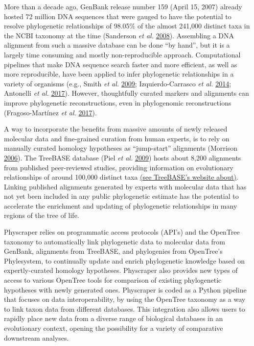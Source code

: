 \documentclass[]{article}
\begin{document}
More than a decade ago, GenBank release number 159 (April 15, 2007) already hosted 72 million DNA sequences that were gauged to have the potential to resolve phylogenetic relationships of 98.05\% of the almost 241,000 distinct taxa in the NCBI taxonomy at the time (Sanderson \emph{et al.} \protect\hyperlink{ref-sanderson2008phylota}{2008}). Assembling a DNA alignment from such a massive database can be done ``by hand'', but it is a largely time consuming and mostly non-reproducible approach. Computational pipelines that make DNA sequence search faster and more efficient, as well as more reproducible, have been applied to infer phylogenetic relationships in a variety of organisms (e.g., Smith \emph{et al.} \protect\hyperlink{ref-smith2009mega}{2009}; Izquierdo-Carrasco \emph{et al.} \protect\hyperlink{ref-izquierdo2014pumper}{2014}; Antonelli \emph{et al.} \protect\hyperlink{ref-antonelli2017toward}{2017}).
However, thoughtfully curated markers and alignments can improve phylogenetic reconstructions, even in phylogenomic reconstructions (Fragoso-Martínez \emph{et al.} \protect\hyperlink{ref-fragoso2017pilot}{2017}).

A way to incorporate the benefits from massive amounts of newly released molecular data and fine-grained curation from human experts, is to rely on manually curated homology hypotheses as ``jump-start'' alignments (Morrison \protect\hyperlink{ref-morrison2006multiple}{2006}). The TreeBASE database (Piel \emph{et al.} \protect\hyperlink{ref-piel2009treebase}{2009}) hosts about 8,200 alignments from published peer-reviewed studies, providing information on evolutionary relationships of around 100,000 distinct taxa \href{https://www.treebase.org/treebase-web/home.html\#:~:text=TreeBASE\%20is\%20produced\%20and\%20governed,mapped\%20to\%20104\%2C593\%20distinct\%20taxa.}{(see TreeBASE's website about)}. Linking published alignments generated by experts with molecular data that has not yet been included in any public phylogenetic estimate has the potential to accelerate the enrichment and updating of phylogenetic relationships in many regions of the tree of life.

Physcraper relies on programmatic access protocols (API's) and the OpenTree taxonomy to automatically link phylogenetic data to molecular data from GenBank, alignments from TreeBASE, and phylogenies from OpenTree's Phylesystem, to continually update and enrich phylogenetic knowledge based on expertly-curated homology hypotheses. Physcraper also provides new types of access to various OpenTree tools for comparison of existing phylogenetic hypotheses with newly generated ones.
Physcraper is coded as a Python pipeline that focuses on data interoperability, by using the OpenTree taxonomy as a way to link taxon data from different databases. This integration also allows users to rapidly place new data from a diverse range of biological databases in an evolutionary context, opening the possibility for a variety of comparative downstream analyses.
\end{document}
